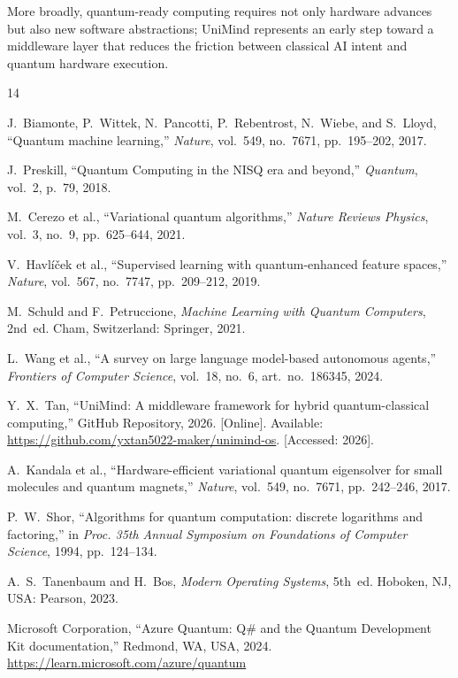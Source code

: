 ﻿\documentclass[12pt,a4paper]{article}
\begin{document}
More broadly, quantum-ready computing requires not only hardware advances but also new software abstractions; UniMind represents an early step toward a middleware layer that reduces the friction between classical AI intent and quantum hardware execution.


\newpage
\begin{thebibliography}{14}

J.~Biamonte, P.~Wittek, N.~Pancotti, P.~Rebentrost, N.~Wiebe, and S.~Lloyd,
``Quantum machine learning,''
\textit{Nature}, vol.~549, no.~7671, pp.~195--202, 2017.

J.~Preskill,
``Quantum Computing in the NISQ era and beyond,''
\textit{Quantum}, vol.~2, p.~79, 2018.

M.~Cerezo et al.,
``Variational quantum algorithms,''
\textit{Nature Reviews Physics}, vol.~3, no.~9, pp.~625--644, 2021.

V.~Havl\'{i}\v{c}ek et al.,
``Supervised learning with quantum-enhanced feature spaces,''
\textit{Nature}, vol.~567, no.~7747, pp.~209--212, 2019.

M.~Schuld and F.~Petruccione,
\textit{Machine Learning with Quantum Computers}, 2nd~ed.
Cham, Switzerland: Springer, 2021.

L.~Wang et al.,
``A survey on large language model-based autonomous agents,''
\textit{Frontiers of Computer Science}, vol.~18, no.~6, art.~no.~186345, 2024.

Y.~X.~Tan,
``UniMind: A middleware framework for hybrid quantum-classical computing,''
GitHub Repository, 2026.
[Online]. Available: \url{https://github.com/yxtan5022-maker/unimind-os}.
[Accessed: 2026].

A.~Kandala et al.,
``Hardware-efficient variational quantum eigensolver for small molecules and quantum magnets,''
\textit{Nature}, vol.~549, no.~7671, pp.~242--246, 2017.

P.~W.~Shor,
``Algorithms for quantum computation: discrete logarithms and factoring,''
in \textit{Proc. 35th Annual Symposium on Foundations of Computer Science},
1994, pp.~124--134.

A.~S.~Tanenbaum and H.~Bos,
\textit{Modern Operating Systems}, 5th~ed.
Hoboken, NJ, USA: Pearson, 2023.

Microsoft Corporation,
``Azure Quantum: Q\# and the Quantum Development Kit documentation,''
Redmond, WA, USA, 2024.
\url{https://learn.microsoft.com/azure/quantum}


\end{thebibliography}
\end{document}
